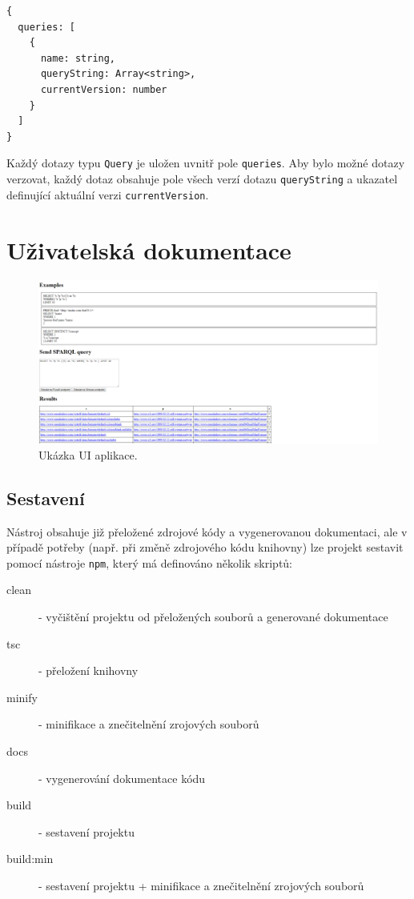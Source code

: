 \documentclass[
12pt,
a4paper,
pdftex,
czech,
titlepage
]{article}
\begin{document}
\begin{Verbatim}[samepage=true]
{
  queries: [						
    {
      name: string,
      queryString: Array<string>,
      currentVersion: number
    }
  ]
}
\end{Verbatim}

Každý dotazy typu \texttt{Query} je uložen uvnitř pole \texttt{queries}. Aby bylo možné dotazy verzovat, každý dotaz obsahuje pole všech verzí dotazu \texttt{queryString} a ukazatel definující aktuální verzi \texttt{currentVersion}.

\section{Uživatelská dokumentace}

\begin{figure}[h]
	\centering
	\includegraphics[width=\textwidth]{view}
	\caption{Ukázka UI aplikace.}
	\label{fig:ui}
\end{figure}

\subsection{Sestavení}
\label{sec:build}

Nástroj obsahuje již přeložené zdrojové kódy a vygenerovanou dokumentaci, ale v případě potřeby (např. při změně zdrojového kódu knihovny) lze projekt sestavit pomocí nástroje \texttt{npm}, který má definováno několik skriptů:

\begin{description}
    \item[clean] - vyčištění projektu od přeložených souborů a generované dokumentace
    \item[tsc] - přeložení knihovny
    \item[minify] - minifikace a znečitelnění zrojových souborů
    \item[docs] - vygenerování dokumentace kódu
    \item[build] - sestavení projektu
    \item[build:min] - sestavení projektu + minifikace a znečitelnění zrojových souborů
\end{description}
\end{document}
